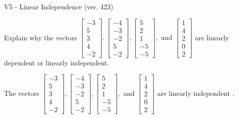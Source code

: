 \begin{exercise}
  \begin{exerciseTitle}V5 - Linear Independence (ver. 423)\end{exerciseTitle}
  \begin{exerciseStatement}
    Explain why the vectors \(\left[\begin{array}{r}
-3 \\
5 \\
3 \\
4 \\
-2
\end{array}\right] , \left[\begin{array}{r}
-4 \\
-3 \\
-2 \\
5 \\
-2
\end{array}\right] , \left[\begin{array}{r}
5 \\
2 \\
1 \\
-5 \\
-5
\end{array}\right] , \text{ and } \left[\begin{array}{r}
1 \\
4 \\
2 \\
0 \\
2
\end{array}\right]\) are linearly dependent or linearly independent.	


  \end{exerciseStatement}
  \begin{exerciseAnswer}
   The vectors \(\left[\begin{array}{r}
-3 \\
5 \\
3 \\
4 \\
-2
\end{array}\right] , \left[\begin{array}{r}
-4 \\
-3 \\
-2 \\
5 \\
-2
\end{array}\right] , \left[\begin{array}{r}
5 \\
2 \\
1 \\
-5 \\
-5
\end{array}\right] , \text{ and } \left[\begin{array}{r}
1 \\
4 \\
2 \\
0 \\
2
\end{array}\right]\) are 
  	 linearly independent  .
  


  \end{exerciseAnswer}
\end{exercise}